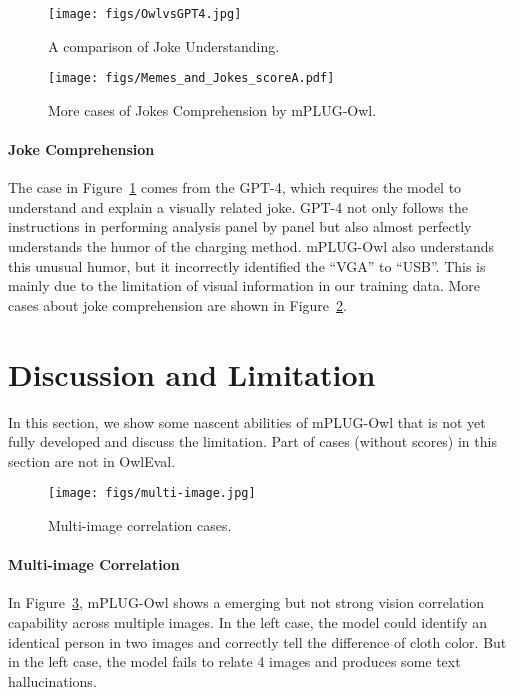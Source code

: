 \documentclass{article}
\newcommand{\modelname}{mPLUG-Owl\xspace}
\newcommand{\evalsetname}{OwlEval\xspace}
\begin{document}
\begin{figure}[!ht]
    \centering
    \texttt{[image: figs/OwlvsGPT4.jpg]}
    \caption{A comparison of Joke Understanding.}
    \label{fig:case_GPT4}
    \vspace{-2mm}
\end{figure}

\begin{figure}[!ht]
    \centering
    \texttt{[image: figs/Memes\_and\_Jokes\_scoreA.pdf]}
    \caption{More cases of Jokes Comprehension by \modelname.}
    \label{fig:Memes_and_Jokes_scoreA}
    \vspace{-2mm}
\end{figure}



\paragraph{Joke Comprehension}
The case in Figure~\ref{fig:case_GPT4} comes from the GPT-4\citep{gpt4}, which requires the model to understand and explain a visually related joke.
GPT-4 not only follows the instructions in performing analysis panel by panel but also almost perfectly understands the humor of the charging method. \modelname also understands this unusual humor, but it incorrectly identified the ``VGA'' to ``USB''. This is mainly due to the limitation of visual information in our training data. More cases about joke comprehension are shown in Figure~\ref{fig:Memes_and_Jokes_scoreA}.






\section{Discussion and Limitation}
In this section, we show some nascent abilities of \modelname that is not yet fully developed and discuss the limitation. Part of cases (without scores) in this section are not in \evalsetname.

\begin{figure}[!ht]
    \centering
    \texttt{[image: figs/multi-image.jpg]}
    \caption{Multi-image correlation cases.}
    \label{fig:appendix_case_twoimg}
    \vspace{-2mm}
\end{figure}

\paragraph{Multi-image Correlation}
In Figure~\ref{fig:appendix_case_twoimg}, \modelname shows a emerging but not strong vision correlation capability across multiple images. In the left case, the model could identify an identical person in two images and correctly tell the difference of cloth color. But in the left case, the model fails to relate 4 images and produces some text hallucinations. 
\end{document}
